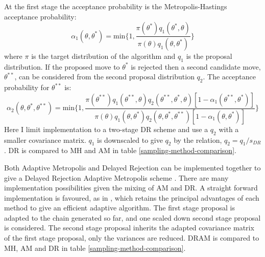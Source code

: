 At the first stage the acceptance probability is the Metropolis-Hastings acceptance probability:
\begin{equation}
	\alpha_1(\theta,\theta^*) = \text{min}\bigg\{1,\frac{\pi(\theta^*)q_1(\theta^*,\theta)}{\pi(\theta)q_1(\theta,\theta^*)} \bigg\}
\end{equation}
where $\pi$ is the target distribution of the algorithm and $q_1$ is the proposal distribution. If the proposed move to $\theta^*$ is rejected then a second candidate move, $\theta^{**}$, can be considered from the second proposal distribution $q_2$. The acceptance probability for $\theta^{**}$ is:
\begin{equation}
	\alpha_2(\theta,\theta^*,\theta^{**}) = \text{min}\bigg\{1,\frac{\pi(\theta^{**})q_1(\theta^{**},\theta)q_2(\theta^{**},\theta^*,\theta)[1-\alpha_1(\theta^{**},\theta^*)]}{\pi(\theta)q_1(\theta,\theta^*)q_2(\theta,\theta^*,\theta^{**})[1-\alpha_1(\theta,\theta^*)]} \bigg\}
\end{equation}
Here I limit implementation to a two-stage DR scheme and use a $q_2$ with a smaller covariance matrix. $q_1$ is downscaled to give $q_2$ by the relation, $q_2 = q_1/s_{DR}$. DR is compared to MH and AM in table \ref{sampling-method-comparison}.\par

Both Adaptive Metropolis and Delayed Rejection can be implemented together to give a Delayed Rejection Adaptive Metropolis scheme \citep{Haario2006}. There are many implementation possibilities given the mixing of AM and DR. A straight forward implementation is favoured, as in \citet{Laine2008}, which retains the principal advantages of each method to give an efficient adaptive algorithm.    The first stage proposal is adapted to the chain generated so far, and one scaled down second stage proposal is considered. The second stage proposal inherits the adapted covariance matrix of the first stage proposal, only the variances are reduced. DRAM is compared to MH, AM and DR in table \ref{sampling-method-comparison}.\par

